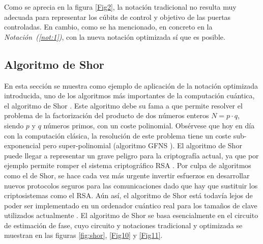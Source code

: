 \documentclass[10pt,conference,a4paper]{IEEEtran}
\begin{document}
Como se aprecia en la figura \ref{Fig2}, la notación tradicional   no resulta muy adecuada para  representar los cúbits de control y objetivo de las puertas controladas. En cambio, como   se ha mencionado, en concreto en la {\it Notación~(\ref{not:1})}, con la nueva notación optimizada sí que es posible.%

\subsection{Algoritmo de Shor}
En esta sección se muestra como ejemplo de aplicación de la notación optimizada introducida, uno de los algoritmos más  importantes de la computación cuántica, el algoritmo de Shor \cite{Shor}. Este algoritmo debe su fama a que permite resolver el problema de la factorización del producto de dos números enteros  $N=p\cdot q$, siendo $p$ y $q$  números primos, con un coste polinomial. 
Obsérvese que hoy en día con la computación clásica, la resolución de este problema tiene un coste sub-exponencial pero super-polinomial (algoritmo GFNS \cite{GNFS} \cite{GNFS_book}). 
El algoritmo de Shor puede llegar a representar un grave peligro para la criptografía actual, ya que por ejemplo permite romper el sistema criptográfico RSA \cite{attack_RSA}. Por culpa de algoritmos como el de Shor, se hace cada vez más urgente invertir esfuerzos  en desarrollar nuevos protocolos seguros para las comunicaciones dado que hay que sustituir los criptosistemas como el RSA. Aún así, el algoritmo de Shor está todavía lejos de poder ser implementado en un ordenador cuántico real para los tamaños de clave utilizados actualmente \cite{schnorr} \cite{integer-factoring} \cite{Shor_PD} \cite{Shor_21}. 
El algoritmo de Shor se basa esencialmente en el circuito de estimación de fase, cuyo circuito y notaciones tradicional y optimizada se muestran en las figuras \ref{fig:shor}, \ref{Fig10} y \ref{Fig11}.
\end{document}
